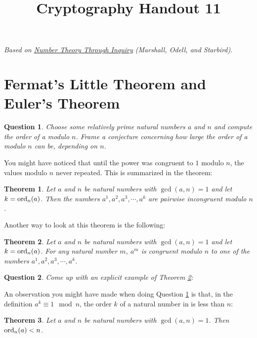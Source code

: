 \documentclass[12pt]{amsart}
\makeatletter
\def\subtitle#1{\gdef\@subtitle{#1}}
\def\@subtitle{}
\theoremstyle{plain}
\newtheorem{thm}{Theorem}
\newtheorem{quest}{Question}
\theoremstyle{definition}
\theoremstyle{remark}
\makeatother
\begin{document}
\onehalfspacing

\title[]{Cryptography Handout 11}
\subtitle{Fermat's Little Theorem and Euler's Theorem}
\maketitle

\begin{center}
\emph{Based on \underline{Number Theory Through Inquiry} (Marshall, Odell, and Starbird)}.
\end{center}

\section{Fermat's Little Theorem and Euler's Theorem}
\begin{quest} \label{Q1}
Choose some relatively prime natural numbers $a$ and $n$ and compute the order of a modulo $n$.  Frame a conjecture concerning how large the order of a modulo $n$ can be, depending on $n$.
\end{quest}

\newpage
You might have noticed that until the power was congruent to $1$ modulo $n$, the values modulo $n$ never repeated.  This is summarized in the theorem:
\begin{thm} \label{T1}
Let $a$ and $n$ be natural numbers with $\gcd(a,n) = 1$ and let $k = \textup{ord}_n(a)$.  Then the numbers $a^1, a^2, a^3, \cdots, a^k$ are pairwise incongruent modulo $n$.
\end{thm}

Another way to look at this theorem is the following:
\begin{thm} \label{T2}
Let $a$ and $n$ be natural numbers with $\gcd(a,n) = 1$ and let $k = \textup{ord}_n(a)$.  For any natural number $m$, $a^m$ is congruent modulo $n$ to one of the numbers $a^1, a^2, a^3, \cdots, a^k$.
\end{thm}

\begin{quest} \label{Q2}
Come up with an explicit example of Theorem \ref{T2}: \vspace{1.5in}
\end{quest}

An observation you might have made when doing Question \ref{Q1} is that, in the definition $a^k \equiv 1 \mod n$, the order $k$ of a natural number in is less than $n$:

\begin{thm} \label{T3}
Let $a$ and $n$ be natural numbers with $\gcd(a,n) = 1$.  Then $\textup{ord}_n(a) < n$.
\end{thm}
\end{document}
